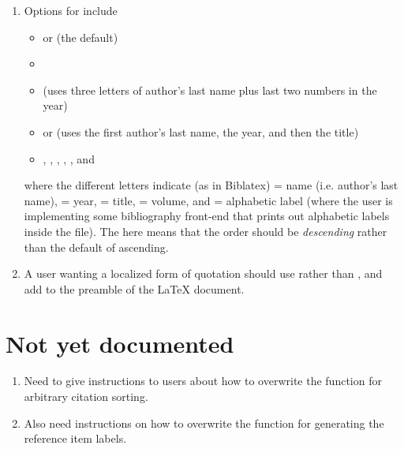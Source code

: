 \documentclass[letterpaper,10pt,english]{sphinxmanual}
\begin{document}
\begin{enumerate}
\item {} 
Options for  include
\begin{itemize}
\item {} 
 or  (the default)

\item {} 

\item {} 
 (uses three letters of author's last name plus last two numbers in the year)

\item {} 
 or  (uses the first author's last name, the year, and then the title)

\item {} 
, , , , , and 

\end{itemize}

where the different letters indicate (as in Biblatex)  = name (i.e. author's last name),  = year,  = title,  = volume, and  = alphabetic label (where the user is implementing some bibliography front-end that prints out alphabetic labels inside the  file). The  here means that the order should be \emph{descending} rather than the default of ascending.

\item {} 
A user wanting a localized form of quotation should use  rather than , and add  to the preamble of the LaTeX document.

\end{enumerate}


\chapter{Not yet documented}
\label{guidelines_for_writing_style_templates:not-yet-documented}\begin{enumerate}
\item {} 
Need to give instructions to users about how to overwrite the  function for arbitrary citation sorting.

\item {} 
Also need instructions on how to overwrite the  function for generating the reference item labels.

\end{enumerate}
\end{document}
